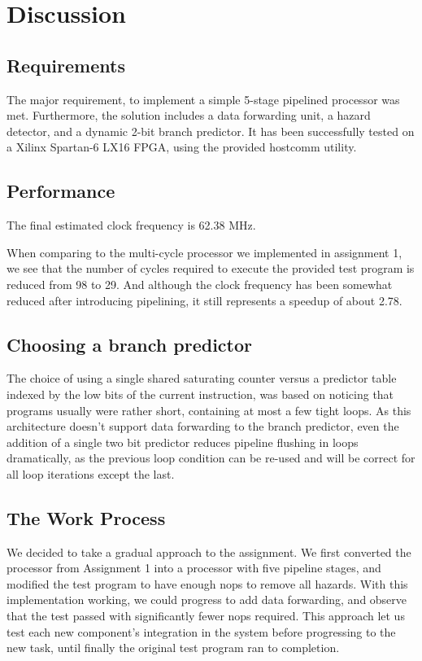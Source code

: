 \chapter{Discussion}

\section{Requirements}
The major requirement, to implement a simple 5-stage pipelined processor was met.
Furthermore, the solution includes a data forwarding unit, a hazard detector, and a dynamic 2-bit branch predictor.
It has been successfully tested on a Xilinx Spartan-6 LX16 FPGA, using the provided hostcomm\cite{hostcomm} utility.

\section{Performance}

The final estimated clock frequency is 62.38 MHz.

When comparing to the multi-cycle processor we implemented in assignment 1, we see that the number of cycles required to execute the provided test program is reduced from 98 to 29.
And although the clock frequency has been somewhat reduced after introducing pipelining, it still represents a speedup of about 2.78.


\section{Choosing a branch predictor}
The choice of using a single shared saturating counter versus a predictor table indexed by the low bits of the current instruction, was based on noticing that programs usually were rather short, containing at most a few tight loops.
As this architecture doesn't support data forwarding to the branch predictor, even the addition of a single two bit predictor reduces pipeline flushing in loops dramatically, as the previous loop condition can be re-used and will be correct for all loop iterations except the last.

\section{The Work Process}
We decided to take a gradual approach to the assignment.
We first converted the processor from Assignment 1 into a processor with five pipeline stages, and modified the test program to have enough nops to remove all hazards.
With this implementation working, we could progress to add data forwarding, and observe that the test passed with significantly fewer nops required.
This approach let us test each new component's integration in the system before progressing to the new task, until finally the original test program ran to completion.


